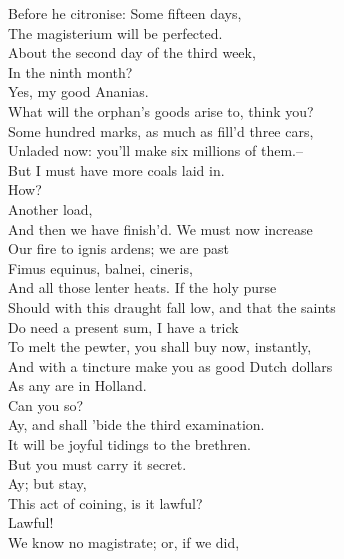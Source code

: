 \documentclass{memoir}
\begin{document}
\begin{drama*}
 Before he citronise: Some fifteen days,\\
 The magisterium will be perfected.\\
\ananiasspeaks  About the second day of the third week,\\
 In the ninth month?\\
\subtlespeaks {} Yes, my good Ananias.\\
\tribulationspeaks  What will the orphan's goods arise to, think you?\\
\subtlespeaks  Some hundred marks, as much as fill'd three cars,\\
 Unladed now: you'll make six millions of them.--\\
 But I must have more coals laid in.\\
\tribulationspeaks {} How?\\
\subtlespeaks {} Another load,\\
 And then we have finish'd. We must now increase\\
 Our fire to ignis ardens; we are past\\
 Fimus equinus, balnei, cineris,\\
 And all those lenter heats. If the holy purse\\
 Should with this draught fall low, and that the saints\\
 Do need a present sum, I have a trick\\
 To melt the pewter, you shall buy now, instantly,\\
 And with a tincture make you as good Dutch dollars\\
 As any are in Holland.\\
\tribulationspeaks {} Can you so?\\
\subtlespeaks  Ay, and shall 'bide the third examination.\\
\ananiasspeaks  It will be joyful tidings to the brethren.\\
\subtlespeaks  But you must carry it secret.\\
\tribulationspeaks {} Ay; but stay,\\
 This act of coining, is it lawful?\\
\ananiasspeaks {} Lawful!\\
 We know no magistrate; or, if we did,\\

\end{drama*}
\end{document}
